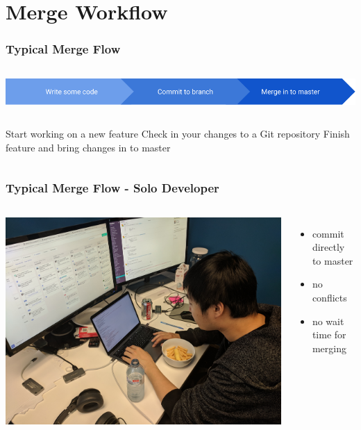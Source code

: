 \documentclass{beamer}
\begin{document}
\section{Merge Workflow}
\begin{frame}
\frametitle{Typical Merge Flow}

  \begin{columns}
    \column{\dimexpr\paperwidth+20pt}
    \includegraphics[width=\paperwidth]{pictures/merge_flow.png}
  \end{columns}
  \vspace{0.3cm}
    \begin{columns}
    Start working on a new feature
    Check in your changes to a Git repository
    Finish feature and bring changes in to master
  \end{columns}

\end{frame}

\begin{frame}
\frametitle{Typical Merge Flow - Solo Developer}
\begin{columns}
    \includegraphics[scale=0.05]{pictures/1_dev.jpg}
\begin{itemize}
    \item commit directly to master
    \item no conflicts
    \item no wait time for merging
\end{itemize}
\end{columns}
\end{frame}
\end{document}
